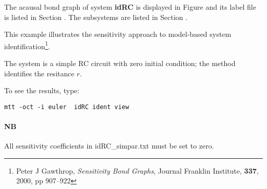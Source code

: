 

   The acausal bond graph of system \textbf{idRC} is
   displayed in Figure  and its label
   file is listed in Section .
   The subsystems are listed in Section .

   
   This example illustrates the sensitivity approach to model-based
   system identification\footnote{Peter J Gawthrop, \emph{Sensitivity
       Bond Graphs}, Journal Franklin Institute, \textbf{337}, 2000,
     pp 907--922}.

   The system is a simple RC circuit with zero initial condition; the
   method identifies the resitance $r$.

   To see the results, type: 
\begin{verbatim}
mtt -oct -i euler  idRC ident view
\end{verbatim}

   \paragraph{NB} All sensitivity coefficients in idRC_simpar.txt must
   be set to zero.